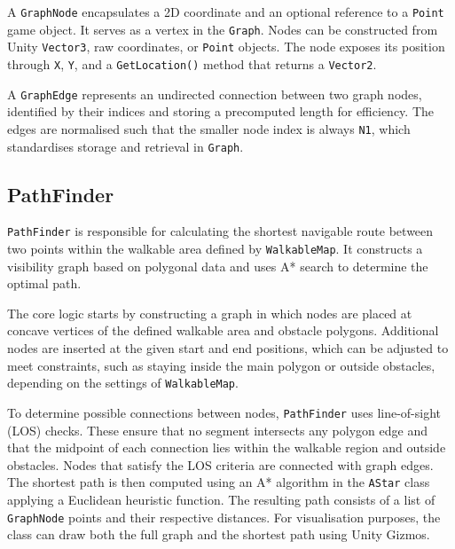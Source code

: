  A \verb|GraphNode| encapsulates a 2D coordinate and an optional reference to a \verb|Point| game object. It serves as a vertex in the \verb|Graph|. Nodes can be constructed from Unity \verb|Vector3|, raw coordinates, or \verb|Point| objects. The node exposes its position through \verb|X|, \verb|Y|, and a \verb|GetLocation()| method that returns a \verb|Vector2|.

 A \verb|GraphEdge| represents an undirected connection between two graph nodes, identified by their indices and storing a precomputed length for efficiency. The edges are normalised such that the smaller node index is always \verb|N1|, which standardises storage and retrieval in \verb|Graph|.


\subsection{PathFinder}
\verb|PathFinder| is responsible for calculating the shortest navigable route between two points within the walkable area defined by \verb|WalkableMap|. It constructs a visibility graph based on polygonal data and uses A* search to determine the optimal path.

The core logic starts by constructing a graph in which nodes are placed at concave vertices of the defined walkable area and obstacle polygons. Additional nodes are inserted at the given start and end positions, which can be adjusted to meet constraints, such as staying inside the main polygon or outside obstacles, depending on the settings of \verb|WalkableMap|.

To determine possible connections between nodes, \verb|PathFinder| uses line-of-sight (LOS) checks. These ensure that no segment intersects any polygon edge and that the midpoint of each connection lies within the walkable region and outside obstacles. Nodes that satisfy the LOS criteria are connected with graph edges. The shortest path is then computed using an A* algorithm in the \verb|AStar| class applying a Euclidean heuristic function.  The resulting path consists of a list of \verb|GraphNode| points and their respective distances. For visualisation purposes, the class can draw both the full graph and the shortest path using Unity Gizmos.




